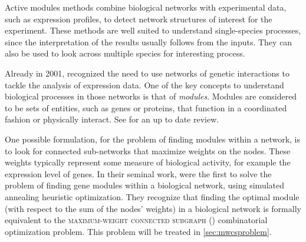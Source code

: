 

\label{subsec:activemodules}

	Active modules methods combine biological networks with experimental data, such as expression profiles, to detect network structures of interest for the experiment.
	These methods are well suited to understand single-species processes, since the interpretation of the results usually follows from the inputs.
	They can also be used to look across multiple species for interesting process.

	Already in 2001, \textcite{altman2001whole} recognized the need to use networks of genetic interactions to tackle the analysis of expression data.
	One of the key concepts to understand biological processes in those networks is that of \emph{modules}.
	Modules are considered to be sets of entities, such as genes or proteins, that function in a coordinated fashion or physically interact.
	See \textcite{mitra2013integrative} for an up to date review.

	One possible formulation, for the problem of finding modules within a network, is to look for connected sub-networks that maximize weights on the nodes.
	These weights typically represent some measure of biological activity, for example the expression level of genes.
	In their seminal work, \textcite{ideker2002discovering} were the first to solve the problem of finding gene modules within a biological network, using simulated annealing heuristic optimization.
	They recognize that finding the optimal module (with respect to the sum of the nodes' weights) in a biological network is formally equivalent to the \textsc{maximum-weight connected subgraph} (\mwcs{}) combinatorial optimization problem.
	This problem will be treated in \cref{sec:mwcsproblem}.

